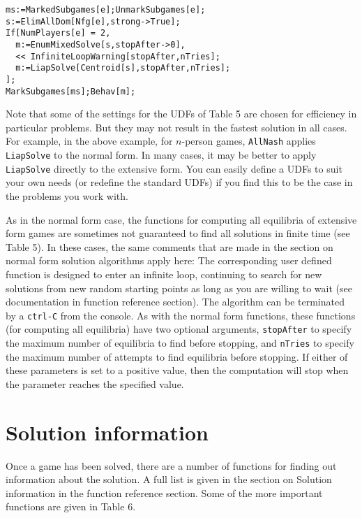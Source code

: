 \begin{verbatim}
ms:=MarkedSubgames[e];UnmarkSubgames[e];
s:=ElimAllDom[Nfg[e],strong->True];
If[NumPlayers[e] = 2, 
  m:=EnumMixedSolve[s,stopAfter->0],
  << InfiniteLoopWarning[stopAfter,nTries];
  m:=LiapSolve[Centroid[s],stopAfter,nTries];
];
MarkSubgames[ms];Behav[m];
\end{verbatim} 

Note that some of the settings for the UDFs of Table 5 are chosen for
efficiency in particular problems.  But they may not result in the
fastest solution in all cases.  For example, in the above example, for
$n$-person games, \verb+AllNash+ applies \verb+LiapSolve+ to the normal form.
In many cases, it may be better to apply \verb+LiapSolve+ directly to
the extensive form.  You can easily define a UDFs to suit your own
needs (or redefine the standard UDFs) if you find this to be the case
in the problems you work with.  

As in the normal form case, the functions for computing all equilibria
of extensive form games are sometimes not guaranteed to find all
solutions in finite time (see Table 5).  In these cases, the same
comments that are made in the section on normal form solution
algorithms apply here: The corresponding user defined function is
designed to enter an infinite loop, continuing to search for new
solutions from new random starting points as long as you are willing
to wait (see documentation in function reference section).  The
algorithm can be terminated by a \verb+ctrl-C+ from the console.  As
with the normal form functions, these functions (for computing all
equilibria) have two optional arguments, \verb+stopAfter+ to specify
the maximum number of equilibria to find before stopping, and
\verb+nTries+ to specify the maximum number of attempts to find
equilibria before stopping. If either of these parameters is set to a
positive value, then the computation will stop when the parameter
reaches the specified value.

\section{Solution information}

Once a game has been solved, there are a number of functions for
finding out information about the solution.  A full list is given in
the section on Solution information in the function reference section.
Some of the more important functions are given in Table 6. 

